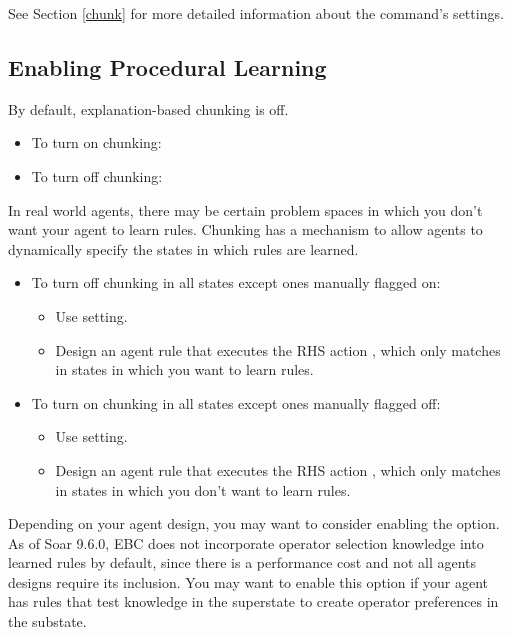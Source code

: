 See Section \ref{chunk} for more detailed information about the  command's settings.

\subsection{Enabling Procedural Learning}
\label{CHUNKING-usage-enable}

By default, explanation-based chunking is off.

\begin{itemize}
	\item To turn on chunking: 
	\item To turn off chunking: 
\end{itemize}

In real world agents, there may be certain problem spaces in which you don't want your agent to learn rules.  Chunking has a mechanism to allow agents to dynamically specify the states in which rules are learned. 

\begin{itemize}
	\item To turn off chunking in all states except ones manually flagged on: 
	\begin{itemize}
		\item Use  setting.
		\item Design an agent rule that executes the RHS action , which only matches in states in which you want to learn rules.
	\end{itemize}
	\item To turn on chunking in all states except ones manually flagged off: 
	\begin{itemize}
		\item Use  setting.
		\item Design an agent rule that executes the RHS action , which only matches in states in which you don't want to learn rules.
	\end{itemize}
\end{itemize}

Depending on your agent design, you may want to consider enabling the  option.  As of Soar 9.6.0, EBC does not incorporate operator selection knowledge into learned rules by default, since there is a performance cost and not all agents designs require its inclusion.  You may want to enable this option if your agent has rules that test knowledge in the superstate to create operator preferences in the substate.

